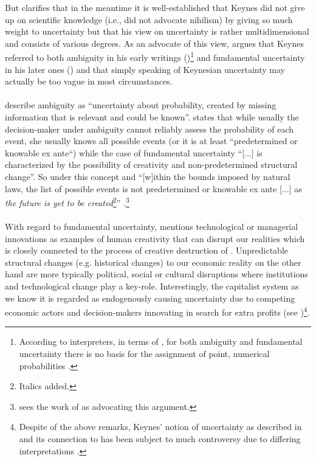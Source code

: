 \documentclass[a4paper,11pt,listof=nochaptergap,oneside,pointednumbers,bibtotoc,bigheadings,liststotoc]{scrbook}
\theoremstyle{mysatz}
\theoremstyle{mydefinition}
\theoremstyle{mybemerkung}
\begin{document}
But \citet{dow:16} clarifies that in the meantime it is well-established that Keynes did not give up on scientific knowledge (i.e., did not advocate nihilism) by giving so much weight to uncertainty but that his view on uncertainty is rather multidimensional and consists of various degrees. As an advocate of this view, \citet{dequesh:00} argues that Keynes referred to both ambiguity in his early writings (\citealp{keynes:21})\footnote{According to interpreters, in terms of \citet{keynes:21}, for both ambiguity and fundamental uncertainty there is no basis for the assignment of point, numerical probabilities \citep{dequesh:00}.} and fundamental uncertainty in his later ones (\citealp{keynes:37}) and that simply speaking of Keynesian uncertainty may actually be too vague in most circumstances. \\
\\
\citet[p. 330]{camererandweber:92} describe ambiguity as ``uncertainty about probability, created by missing information that is relevant and could be known''. \citet[p. 623]{dequech:14} states that while usually the decision-maker under ambiguity cannot reliably assess the probability of each event, she usually knows all possible events (or it is at least ``predetermined or knowable ex ante``) while the case of fundamental uncertainty ``[...] is characterized by the possibility of creativity and non-predetermined structural change''. So under this concept and ``[w]ithin the bounds imposed by natural laws, the list of possible events is not predetermined or knowable ex ante [...] as \textit{the future is yet to be created}\footnote{Italics added.}'' \citep[p. 623]{dequech:14}.\footnote{\citet{dequesh:00} sees the work of \citet{shackle:72} as advocating this argument.}\\
\\
With regard to fundamental uncertainty, \citet{dequesh:00} mentions technological or managerial innovations as examples of human creativity that can disrupt our realities which is closely connected to the process of creative destruction of \citet{schumpeter:42}. Unpredictable structural changes (e.g. historical changes) to our economic reality on the other hand are more typically political, social or cultural disruptions where institutions and technological change play a key-role. Interestingly, the capitalist system as we know it is regarded as endogenously causing uncertainty due to competing economic actors and decision-makers innovating in search for extra profits (see \citealp{kregel:87})\footnote{Despite of the above remarks, Keynes' notion of uncertainty as described in \citet{keynes:21} and its connection to \citet{keynes:37} has been subject to much controversy due to differing interpretations \citep{dequesh:00}.}.\\
\end{document}
